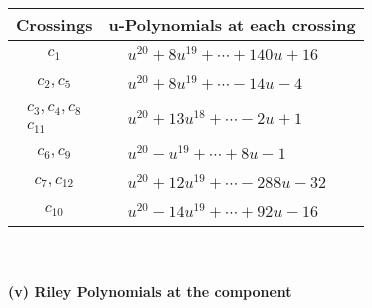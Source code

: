 \documentclass[1p]{elsarticle_modified}
\theoremstyle{definition}
\begin{document}
\begin{tabular}{m{50pt}|m{274pt}}
Crossings & \hspace{64pt}u-Polynomials at each crossing \\
\hline $$\begin{aligned}c_{1}\end{aligned}$$&$\begin{aligned}
&u^{20}+8 u^{19}+\cdots+140 u+16
\end{aligned}$\\
\hline $$\begin{aligned}c_{2},c_{5}\end{aligned}$$&$\begin{aligned}
&u^{20}+8 u^{19}+\cdots-14 u-4
\end{aligned}$\\
\hline $$\begin{aligned}c_{3},c_{4},c_{8}\\c_{11}\end{aligned}$$&$\begin{aligned}
&u^{20}+13 u^{18}+\cdots-2 u+1
\end{aligned}$\\
\hline $$\begin{aligned}c_{6},c_{9}\end{aligned}$$&$\begin{aligned}
&u^{20}- u^{19}+\cdots+8 u-1
\end{aligned}$\\
\hline $$\begin{aligned}c_{7},c_{12}\end{aligned}$$&$\begin{aligned}
&u^{20}+12 u^{19}+\cdots-288 u-32
\end{aligned}$\\
\hline $$\begin{aligned}c_{10}\end{aligned}$$&$\begin{aligned}
&u^{20}-14 u^{19}+\cdots+92 u-16
\end{aligned}$\\
\hline
\end{tabular}\\~\\
\newpage\renewcommand{\arraystretch}{1}
\flushleft \textbf{(v) Riley Polynomials at the component}\newline \\
\end{document}
